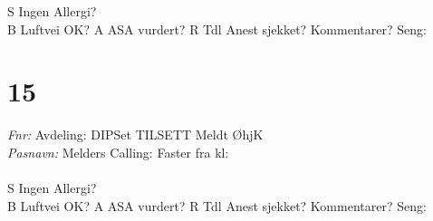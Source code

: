 \documentclass[article]{res}
\begin{document}
\begin{resume}
  S \hfill Ingen Allergi? \makebox[0pt][l]{$\square$}\raisebox{.15ex}{\hspace{0.6em}} \\ \newline 
  B \hfill Luftvei OK? \makebox[0pt][l]{$\square$}\raisebox{.15ex}{\hspace{0.8em}} \newline \newline
  A \hfill ASA vurdert?\makebox[0pt][l]{$\square$}\raisebox{.15ex}{\hspace{0.8em}} \newline \newline
  R \hfill Tdl Anest sjekket? \makebox[0pt][l]{$\square$}\raisebox{.15ex}{\hspace{0.8em}} \newline \newline
  Kommentarer? \hfill Seng: \hspace{.8em}
 \noindent\makebox[\linewidth]{\rule{\paperwidth}{0.4pt}}

\section{15 \hspace{2em} }\vspace{.6em}
  {\sl Fnr:}  \hspace{15em}Avdeling: \hfill DIPSet \makebox[0pt][l]{$\square$}\raisebox{.15ex}{\hspace{1em}}
   TILSETT \makebox[0pt][l]{$\square$}\raisebox{.15ex}{\hspace{0.7em}} Meldt ØhjK \makebox[0pt][l]{$\square$}\raisebox{.15ex}{\hspace{0.1em}}
   \\ \newline
  {\sl Pasnavn:}   \hfill Melders Calling: \hspace{2em} Faster fra kl:\hspace{2em} \\
  \\
  S \hfill Ingen Allergi? \makebox[0pt][l]{$\square$}\raisebox{.15ex}{\hspace{0.8em}} \\ \newline 
  B \hfill Luftvei OK? \makebox[0pt][l]{$\square$}\raisebox{.15ex}{\hspace{0.8em}} \newline \newline
  A \hfill ASA vurdert?\makebox[0pt][l]{$\square$}\raisebox{.15ex}{\hspace{0.8em}} \newline \newline
  R \hfill Tdl Anest sjekket? \makebox[0pt][l]{$\square$}\raisebox{.15ex}{\hspace{0.8em}} \newline \newline
  Kommentarer? \hfill Seng: \hspace{.8em}
\noindent\makebox[\linewidth]{\rule{\paperwidth}{0.2pt}}


\end{resume}
\end{document}
